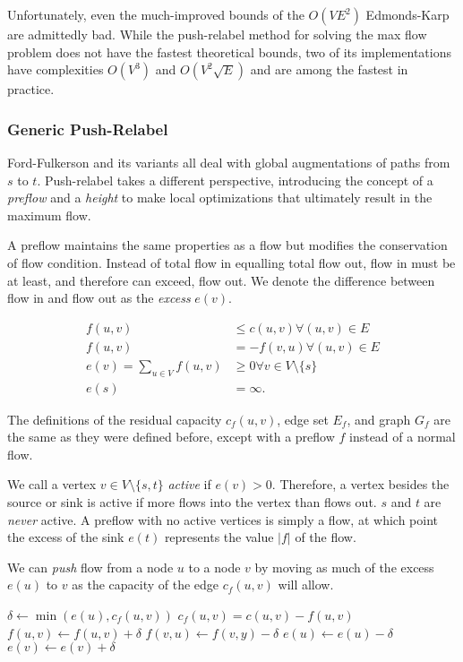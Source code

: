 Unfortunately, even the much-improved bounds of the $O(VE^2)$ Edmonds-Karp are admittedly bad. While the push-relabel method for solving the max flow problem does not have the fastest theoretical bounds, two of its implementations have complexities $O(V^3)$ and $O(V^2\sqrt{E})$ and are among the fastest in practice.

\subsubsection{Generic Push-Relabel}

Ford-Fulkerson and its variants all deal with global augmentations of paths from $s$ to $t$. Push-relabel takes a different perspective, introducing the concept of a \textit{preflow} and a \textit{height} to make local optimizations that ultimately result in the maximum flow.

A preflow maintains the same properties as a flow but modifies the conservation of flow condition. Instead of total flow in equalling total flow out, flow in must be at least, and therefore can exceed, flow out. We denote the difference between flow in and flow out as the \textit{excess} $e(v)$.

\begin{align*}
f(u,v) &\le c(u,v) \forall (u,v) \in E \\
f(u,v) &= -f(v,u) \forall (u,v) \in E \\
e(v) = \sum_{u \in V} f(u,v) &\ge 0 \forall v \in V \setminus \{s\} \\
e(s) &= \infty.
\end{align*}

The definitions of the residual capacity $c_f(u,v)$, edge set $E_f$, and graph $G_f$ are the same as they were defined before, except with a preflow $f$ instead of a normal flow.

We call a vertex $v \in V \setminus \{s, t\}$ \textit{active} if $e(v) > 0$. Therefore, a vertex besides the source or sink is active if more flows into the vertex than flows out. $s$ and $t$ are \textit{never} active. A preflow with no active vertices is simply a flow, at which point the excess of the sink $e(t)$ represents the value $|f|$ of the flow.

We can \textit{push} flow from a node $u$ to a node $v$ by moving as much of the excess $e(u)$ to $v$ as the capacity of the edge $c_f(u,v)$ will allow.

\noindent \begin{minipage}{\textwidth}
\begin{algorithmic}
	\State $\delta \gets \min(e(u), c_f(u,v))$
	\Comment $c_f(u,v) = c(u,v) - f(u,v)$
	\State $f(u,v) \gets f(u,v) + \delta$
	\State $f(v,u) \gets f(v,y) - \delta$
	\State $e(u) \gets e(u) - \delta$
	\State $e(v) \gets e(v) + \delta$
\EndFunction
\end{algorithmic}
\end{minipage}

